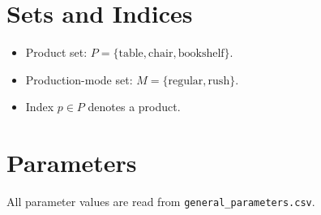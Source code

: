 \section*{Sets and Indices}

\begin{itemize}
    \item Product set: $P = \{\text{table},\text{chair},\text{bookshelf}\}$.
    \item Production-mode set: $M = \{\text{regular},\text{rush}\}$.
    \item Index $p \in P$ denotes a product.
\end{itemize}

\section*{Parameters}

All parameter values are read from \texttt{general\_parameters.csv}.

